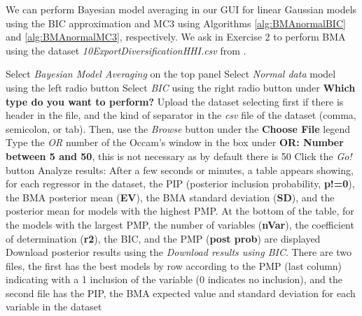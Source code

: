 We can perform Bayesian model averaging in our GUI for linear Gaussian models using the BIC approximation and MC3 using Algorithms \ref{alg:BMAnormalBIC} and \ref{alg:BMAnormalMC3}, respectively. We ask in Exercise 2 to perform BMA using the dataset \textit{10ExportDiversificationHHI.csv} from \cite{Jetter2015}.  

\begin{algorithm}[h!]
	\caption{Bayesian model averaging in linear Gaussian models using the Bayesian information criterion}\label{alg:BMAnormalBIC}
	\begin{algorithmic}[1]  		 			
		\State Select \textit{Bayesian Model Averaging} on the top panel
		\State Select \textit{Normal data} model using the left radio button
		\State Select \textit{BIC} using the right radio button under \textbf{Which type do you want to perform?}
		\State Upload the dataset selecting first if there is header in the file, and the kind of separator in the \textit{csv} file of the dataset (comma, semicolon, or tab). Then, use the \textit{Browse} button under the \textbf{Choose File} legend
		\State Type the \textit{OR} number of the Occam's window in the box under \textbf{OR: Number between 5 and 50}, this is not necessary as by default there is 50
		\State Click the \textit{Go!} button
		\State Analyze results: After a few seconds or minutes, a table appears showing, for each regressor in the dataset, the PIP (posterior inclusion probability, \textbf{p!=0}), the BMA posterior mean (\textbf{EV}), the BMA standard deviation (\textbf{SD}), and the posterior mean for models with the highest PMP. At the bottom of the table, for the models with the largest PMP, the number of variables (\textbf{nVar}), the coefficient of determination (\textbf{r2}), the BIC, and the PMP (\textbf{post prob}) are displayed
		\State Download posterior results using the \textit{Download results using BIC}. There are two files, the first has the best models by row according to the PMP (last column) indicating with a 1 inclusion of the variable (0 indicates no inclusion), and the second file has the PIP, the BMA expected value and standard deviation for each variable in the dataset
	\end{algorithmic} 
\end{algorithm}

